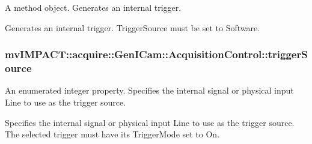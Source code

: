 A method object. Generates an internal trigger. 

Generates an internal trigger. Trigger\+Source must be set to Software. \hypertarget{classmv_i_m_p_a_c_t_1_1acquire_1_1_gen_i_cam_1_1_acquisition_control_a194c05945e0e60054d7e427c08aba4fe}{
\subsubsection[{trigger\+Source}]{ mv\+I\+M\+P\+A\+C\+T\+::acquire\+::\+Gen\+I\+Cam\+::\+Acquisition\+Control\+::trigger\+Source}}\label{classmv_i_m_p_a_c_t_1_1acquire_1_1_gen_i_cam_1_1_acquisition_control_a194c05945e0e60054d7e427c08aba4fe}


An enumerated integer property. Specifies the internal signal or physical input Line to use as the trigger source. 

Specifies the internal signal or physical input Line to use as the trigger source. The selected trigger must have its Trigger\+Mode set to On.

